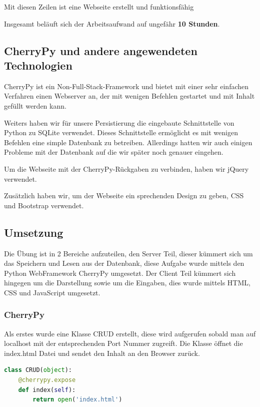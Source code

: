 Mit diesen Zeilen ist eine Webseite erstellt und funktionsfähig

Insgesamt beläuft sich der Arbeitsaufwand auf ungefähr \textbf{10 Stunden}.

\subsection{CherryPy und andere angewendeten Technologien}

CherryPy ist ein Non-Full-Stack-Framework und bietet mit einer sehr einfachen Verfahren einen Webserver an, der mit wenigen Befehlen gestartet und mit Inhalt gefüllt werden kann.

Weiters haben wir für unsere Persistierung die eingebaute Schnittstelle von Python zu SQLite verwendet. Dieses Schnittstelle ermöglicht es mit wenigen Befehlen eine simple Datenbank zu betreiben. Allerdings hatten wir auch einigen Probleme mit der Datenbank auf die wir später noch genauer eingehen.

Um die Webseite mit der CherryPy-Rückgaben zu verbinden, haben wir jQuery verwendet. 

Zusätzlich haben wir, um der Webseite ein sprechenden Design zu geben, CSS und Bootstrap verwendet. 


\subsection{Umsetzung}


Die Übung ist in 2 Bereiche aufzuteilen, den Server Teil, dieser kümmert sich um das Speichern und Lesen aus der Datenbank, diese Aufgabe wurde mittels den Python WebFramework CherryPy umgesetzt. Der Client Teil kümmert sich hingegen um die Darstellung sowie um die Eingaben, dies wurde mittels HTML, CSS und JavaScript umgesetzt.

\subsubsection{CherryPy}

Als erstes wurde eine Klasse CRUD erstellt, diese wird aufgerufen sobald man auf localhost mit der entsprechenden Port Nummer zugreift. Die Klasse öffnet die index.html Datei und sendet den Inhalt an den Browser zurück.

\begin{lstlisting}[language=Python, caption=Klasse zur Darstellung der Index.html]
class CRUD(object):
	@cherrypy.expose
	def index(self):
		return open('index.html')
\end{lstlisting}

